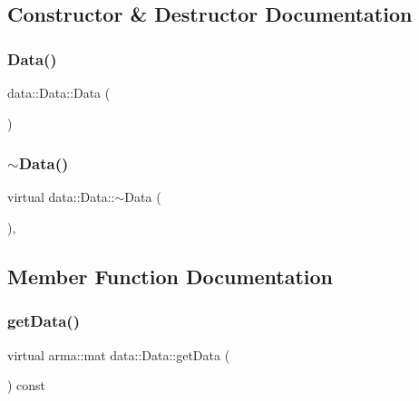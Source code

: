 \subsection{Constructor \& Destructor Documentation}
\mbox{\label{classdata_1_1_data_ae571957bf5380fe4b3233dd799063f1e}} 
\subsubsection{\texorpdfstring{Data()}{Data()}}
{\footnotesize\ttfamily data\+::\+Data\+::\+Data (\begin{DoxyParamCaption}{ }\end{DoxyParamCaption})}

\mbox{\label{classdata_1_1_data_a737d2c889ffb7c08d60b5af5846b586b}} 
\subsubsection{\texorpdfstring{$\sim$\+Data()}{~Data()}}
{\footnotesize\ttfamily virtual data\+::\+Data\+::$\sim$\+Data (\begin{DoxyParamCaption}{ }\end{DoxyParamCaption})\hspace{0.3cm}{\ttfamily [inline]}, {\ttfamily [virtual]}}



\subsection{Member Function Documentation}
\mbox{\label{classdata_1_1_data_aa4073af1bc8ccc7c50809e1676436eb4}} 
\subsubsection{\texorpdfstring{get\+Data()}{getData()}}
{\footnotesize\ttfamily virtual arma\+::mat data\+::\+Data\+::get\+Data (\begin{DoxyParamCaption}{ }\end{DoxyParamCaption}) const\hspace{0.3cm}{\ttfamily [pure virtual]}}



